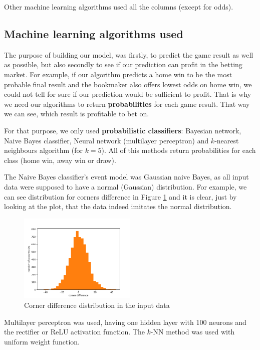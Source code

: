 \documentclass[conference]{IEEEtran}
\begin{document}
Other machine learning algorithms used all the columns (except for odds).

\subsection{Machine learning algorithms used}

The purpose of building our model, was firstly, to predict the game result as well as possible,
but also secondly to see if our prediction can profit in the betting market. For example,
if our algorithm predicts a home win to be the most probable final result and the bookmaker
also offers lowest odds on home win, we could not tell for sure if our prediction would be
sufficient to profit. That is why we need our algorithms to return \textbf{probabilities} for
each game result. That way we can see, which result is profitable to bet on.

For that purpose, we only used \textbf{probabilistic classifiers}: Bayesian network, Naive
Bayes classifier, Neural network (multilayer perceptron) and $k$-nearest neighbours algorithm 
(for $k=5$). All of this methods return probabilities for each class (home win, away win or draw).

The Naive Bayes classifier's event model was Gaussian naive Bayes, as all input data were 
supposed to have a normal (Gaussian) distribution. For example, we can see distribution
for corners difference in Figure \ref{corner_diff} and it is clear, just by looking at the plot, that the data
indeed imitates the normal distribution.

\begin{figure}[!ht]
\includegraphics[width=0.5\textwidth]{corner_diff_dist.png}
\caption{Corner difference distribution in the input data}
\label{corner_diff}
\end{figure}

Multilayer perceptron was used, having one hidden layer with 100 neurons and the rectifier or ReLU 
activation function. The $k$-NN method was used with uniform weight function.
\end{document}
